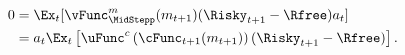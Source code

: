   \begin{equation}\begin{gathered}\begin{aligned}
        0  & = \Ex_{t}[{\vFunc}_{\MidStepp}^{{m}}({m}_{t+1})(\Risky_{t+1}-\Rfree){a}_{t}] \notag
        \\         & = {a}_{t}\Ex_{t}\left[\uFunc^{{c}}\left(\cFunc_{t+1}({m}_{t+1})\right)(\Risky_{t+1}-\Rfree)\right] \label{eq:FOCw}.
      \end{aligned}\end{gathered}\end{equation}
